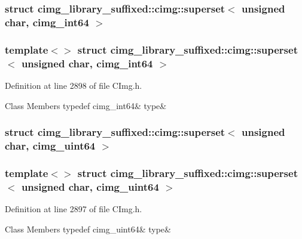 \subsubsection{struct cimg\+\_\+library\+\_\+suffixed\+:\+:cimg\+:\+:superset$<$ unsigned char, cimg\+\_\+int64 $>$}
\subsubsection*{template$<$$>$\newline
struct cimg\+\_\+library\+\_\+suffixed\+::cimg\+::superset$<$ unsigned char, cimg\+\_\+int64 $>$}



Definition at line 2898 of file C\+Img.\+h.

\begin{DoxyFields}{Class Members}
\mbox{\label{namespacecimg__library__suffixed_1_1cimg_a6d737c40b6d78eae8ad679b078d1dcc7}} 
typedef cimg\_int64&
type&
\\
\hline

\end{DoxyFields}
\label{structcimg__library__suffixed_1_1cimg_1_1superset_3_01unsigned_01char_00_01cimg__uint64_01_4}
\subsubsection{struct cimg\+\_\+library\+\_\+suffixed\+:\+:cimg\+:\+:superset$<$ unsigned char, cimg\+\_\+uint64 $>$}
\subsubsection*{template$<$$>$\newline
struct cimg\+\_\+library\+\_\+suffixed\+::cimg\+::superset$<$ unsigned char, cimg\+\_\+uint64 $>$}



Definition at line 2897 of file C\+Img.\+h.

\begin{DoxyFields}{Class Members}
\mbox{\label{namespacecimg__library__suffixed_1_1cimg_a176ff089eac29305efcc9929fee5563c}} 
typedef cimg\_uint64&
type&
\\
\hline

\end{DoxyFields}
\label{structcimg__library__suffixed_1_1cimg_1_1superset_3_01unsigned_01char_00_01double_01_4}
